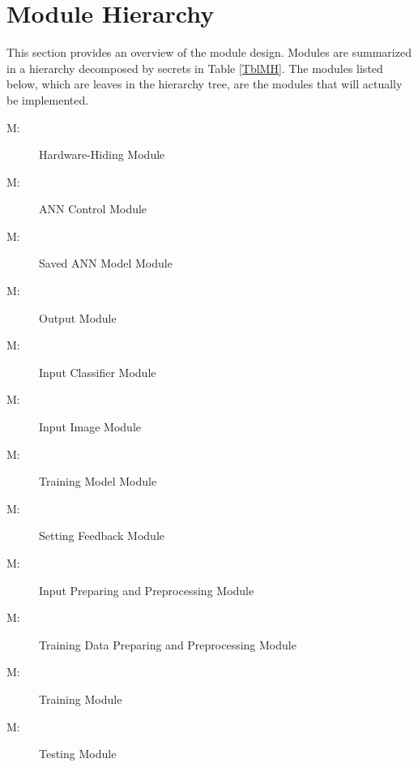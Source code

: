 \documentclass[12pt, titlepage]{article}
\newcounter{mnum}
\newcommand{\mthemnum}{M\themnum}
\begin{document}
\section{Module Hierarchy} \label{SecMH}

This section provides an overview of the module design. Modules are summarized
in a hierarchy decomposed by secrets in Table \ref{TblMH}. The modules listed
below, which are leaves in the hierarchy tree, are the modules that will
actually be implemented.

\begin{description}
\item [ \mthemnum \label{HW}:] Hardware-Hiding Module
\item [ \mthemnum \label{ACM}:] ANN Control Module
\item [ \mthemnum \label{SavedANN}:] Saved ANN Model Module
\item [ \mthemnum \label{Output}:] Output Module
\item [ \mthemnum \label{In-class}:] Input Classifier Module
\item [ \mthemnum \label{In-set}:] Input Image Module
\item [ \mthemnum \label{Train-Model}:] Training Model Module
\item [ \mthemnum \label{Feedback}:] Setting Feedback Module
\item [ \mthemnum \label{In-prep}:] Input Preparing and Preprocessing Module
\item [ \mthemnum \label{Train-Data}:] Training Data Preparing and Preprocessing Module
\item [ \mthemnum \label{Train}:] Training Module
\item [ \mthemnum \label{Test}:] Testing Module
\end{description}
\end{document}
